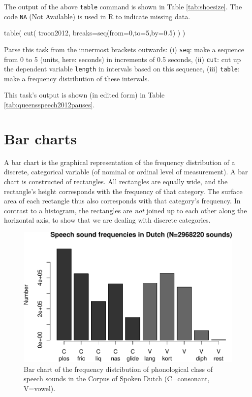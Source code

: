 \documentclass[
]{book}
\newenvironment{Shaded}{\begin{snugshade}}{\end{snugshade}}
\newcommand{\AttributeTok}[1]{\textcolor[rgb]{0.77,0.63,0.00}{#1}}
\newcommand{\DecValTok}[1]{\textcolor[rgb]{0.00,0.00,0.81}{#1}}
\newcommand{\FloatTok}[1]{\textcolor[rgb]{0.00,0.00,0.81}{#1}}
\newcommand{\FunctionTok}[1]{\textcolor[rgb]{0.00,0.00,0.00}{#1}}
\newcommand{\NormalTok}[1]{#1}
\begin{document}
The output of the above \texttt{table} command is shown in Table \ref{tab:shoesize}.
The code \texttt{NA} (Not Available) is used in R to indicate missing data.

\begin{Shaded}
\begin{Highlighting}[]
\FunctionTok{table}\NormalTok{( }\FunctionTok{cut}\NormalTok{( troon2012, }\AttributeTok{breaks=}\FunctionTok{seq}\NormalTok{(}\AttributeTok{from=}\DecValTok{0}\NormalTok{,}\AttributeTok{to=}\DecValTok{5}\NormalTok{,}\AttributeTok{by=}\FloatTok{0.5}\NormalTok{) ) )}
\end{Highlighting}
\end{Shaded}

Parse this task from the innermost brackets outwards:
(i) \texttt{seq}: make a sequence from 0 to 5 (units, here: seconds) in increments of 0.5 seconds,
(ii) \texttt{cut}: cut up the dependent variable \texttt{length} in intervals based on this sequence,
(iii) \texttt{table}: make a frequency distribution of these intervals.

This task's output is shown (in edited form) in Table \ref{tab:queensspeech2012pauses}.

\hypertarget{sec:barcharts}{%
\section{Bar charts}\label{sec:barcharts}}

A bar chart is the graphical representation of the
frequency distribution of a discrete, categorical variable (of
nominal or ordinal level of measurement). A bar chart is constructed
of rectangles. All rectangles are equally wide, and the
rectangle's height corresponds with the frequency of that category. The
surface area of each rectangle thus also corresponds with that category's frequency.
In contrast to a histogram, the rectangles are \emph{not}
joined up to each other along the horizontal axis, to
show that we are dealing with discrete categories.

\begin{figure}
\centering
\includegraphics{QMS-EN_files/figure-latex/klankfreq-barplot-1.pdf}
\caption{\label{fig:klankfreq-barplot}Bar chart of the frequency distribution of phonological class of speech sounds in the Corpus of Spoken Dutch (C=consonant, V=vowel).}
\end{figure}
\end{document}
